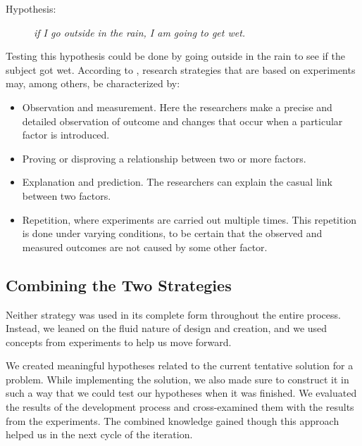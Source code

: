 \begin{description}
    \item[Hypothesis:]{\textit{if I go outside in the rain, I am going to get wet.}}
\end{description}

Testing this hypothesis could be done by going outside in the rain to see if the subject got wet. According to \citet[pp.~126--129]{oates2005researching}, research strategies that are based on experiments may, among others, be characterized by:

\begin{itemize}
    \item Observation and measurement. Here the researchers make a precise and detailed observation of outcome and changes that occur when a particular factor is introduced.
    \item Proving or disproving a relationship between two or more factors.
    \item Explanation and prediction. The researchers can explain the casual link between two factors.
    \item Repetition, where experiments are carried out multiple times. This repetition is done under varying conditions, to be certain that the observed and measured outcomes are not caused by some other factor.
\end{itemize}

\subsection{Combining the Two Strategies}
\label{sec:combining_the_two_strategies}
Neither strategy was used in its complete form throughout the entire process. Instead, we leaned on the fluid nature of design and creation, and we used concepts from experiments to help us move forward. 

We created meaningful hypotheses related to the current tentative solution for a problem. While implementing the solution, we also made sure to construct it in such a way that we could test our hypotheses when it was finished. We evaluated the results of the development process and cross-examined them with the results from the experiments. The combined knowledge gained though this approach helped us in the next cycle of the iteration.


